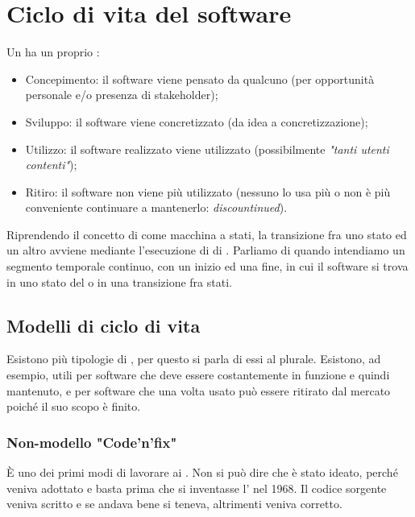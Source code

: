\documentclass[../main]{subfiles}
\begin{document}
\section{Ciclo di vita del software}
Un  ha un proprio :
\begin{itemize}
    \item Concepimento: il software viene pensato da qualcuno (per opportunità personale e/o presenza di stakeholder);
    \item Sviluppo: il software viene concretizzato (da idea a concretizzazione);
    \item Utilizzo: il software realizzato viene utilizzato (possibilmente \textit{"tanti utenti contenti"});
    \item Ritiro: il software non viene più utilizzato (nessuno lo usa più o non è più conveniente continuare a mantenerlo: \textit{discountinued}).
\end{itemize}
Riprendendo il concetto di  come macchina a stati, la transizione fra uno stato ed un altro avviene mediante l'esecuzione di  di .\newline
Parliamo di  quando intendiamo un segmento temporale continuo, con un inizio ed una fine, in cui il software si trova in uno stato del  o in una transizione fra stati.
\subsection{Modelli di ciclo di vita}
Esistono più tipologie di , per questo si parla di essi al plurale. Esistono, ad esempio,  utili per software che deve essere costantemente in funzione e quindi mantenuto, e  per software che una volta usato può essere ritirato dal mercato poiché il suo scopo è finito.
\subsubsection{Non-modello "Code'n'fix"}
È uno dei primi modi di lavorare ai . Non si può dire che è stato ideato, perché veniva adottato e basta prima che si inventasse l' nel 1968. Il codice sorgente veniva scritto e se andava bene si teneva, altrimenti veniva corretto.
\end{document}
